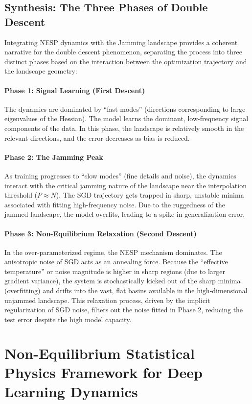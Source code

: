 \documentclass[
  journal=largetwo,
  year=2025,
  volume=37,
]{cup-journal}
\begin{document}
\subsection{Synthesis: The Three Phases of Double Descent}
Integrating NESP dynamics with the Jamming landscape provides a coherent narrative for the double descent phenomenon, separating the process into three distinct phases based on the interaction between the optimization trajectory and the landscape geometry:

\paragraph{Phase 1: Signal Learning (First Descent)} 
The dynamics are dominated by ``fast modes'' (directions corresponding to large eigenvalues of the Hessian). The model learns the dominant, low-frequency signal components of the data. In this phase, the landscape is relatively smooth in the relevant directions, and the error decreases as bias is reduced.

\paragraph{Phase 2: The Jamming Peak} 
As training progresses to ``slow modes'' (fine details and noise), the dynamics interact with the critical jamming nature of the landscape near the interpolation threshold ($P \approx N$). The SGD trajectory gets trapped in sharp, unstable minima associated with fitting high-frequency noise. Due to the ruggedness of the jammed landscape, the model overfits, leading to a spike in generalization error.

\paragraph{Phase 3: Non-Equilibrium Relaxation (Second Descent)} 
In the over-parameterized regime, the NESP mechanism dominates. The anisotropic noise of SGD acts as an annealing force. Because the ``effective temperature'' or noise magnitude is higher in sharp regions (due to larger gradient variance), the system is stochastically kicked out of the sharp minima (overfitting) and drifts into the vast, flat basins available in the high-dimensional unjammed landscape. This relaxation process, driven by the implicit regularization of SGD noise, filters out the noise fitted in Phase 2, reducing the test error despite the high model capacity.

\section{Non-Equilibrium Statistical Physics Framework for Deep Learning Dynamics}
\end{document}
